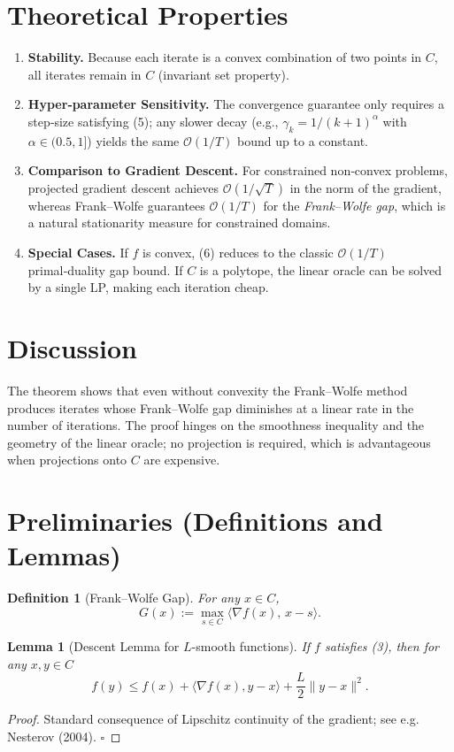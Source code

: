 \documentclass{article}
\newtheorem{lemma}{Lemma}
\newtheorem{definition}{Definition}
\begin{document}
\section*{Theoretical Properties}
\begin{enumerate}[label=\arabic*.]
\item \textbf{Stability.} Because each iterate is a convex combination of two points in \(C\), all iterates remain in \(C\) (invariant set property).
\item \textbf{Hyper‑parameter Sensitivity.} The convergence guarantee only requires a step‑size satisfying (5); any slower decay (e.g., \(\gamma_{k}=1/(k+1)^{\alpha}\) with \(\alpha\in(0.5,1]\)) yields the same \(\mathcal{O}(1/T)\) bound up to a constant.
\item \textbf{Comparison to Gradient Descent.}
For constrained non‑convex problems, projected gradient descent achieves
\(\mathcal{O}(1/\sqrt{T})\) in the norm of the gradient, whereas Frank–Wolfe
guarantees \(\mathcal{O}(1/T)\) for the \emph{Frank–Wolfe gap}, which is a
natural stationarity measure for constrained domains.
\item \textbf{Special Cases.}
If \(f\) is convex, (6) reduces to the classic \(\mathcal{O}(1/T)\) primal‑duality gap
bound.  If \(C\) is a polytope, the linear oracle can be solved by a single
LP, making each iteration cheap.
\end{enumerate}

\section*{Discussion}
The theorem shows that even without convexity the Frank–Wolfe method
produces iterates whose Frank–Wolfe gap diminishes at a linear rate in
the number of iterations.  The proof hinges on the smoothness inequality
and the geometry of the linear oracle; no projection is required, which
is advantageous when projections onto \(C\) are expensive.

\newpage
\section*{Preliminaries (Definitions and Lemmas)}
\begin{definition}[Frank–Wolfe Gap]\label{def:gap}
For any \(x\in C\),
\[
G(x):=\max_{s\in C}\langle \nabla f(x),\,x-s\rangle.
\]
\end{definition}
\begin{lemma}[Descent Lemma for \(L\)-smooth functions]\label{lem:descent}
If \(f\) satisfies (3), then for any \(x,y\in C\)
\[
f(y)\le f(x)+\langle\nabla f(x),y-x\rangle+\frac{L}{2}\|y-x\|^{2}.
\tag{7}
\]
\end{lemma}
\begin{proof}
Standard consequence of Lipschitz continuity of the gradient; see e.g. Nesterov (2004). \hfill\(\square\)
\end{proof}
\end{document}
